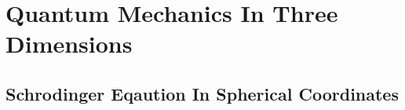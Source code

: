 \chapter{Quantum Mechanics In Three Dimensions}
\section{Schrodinger Eqaution In Spherical Coordinates}
